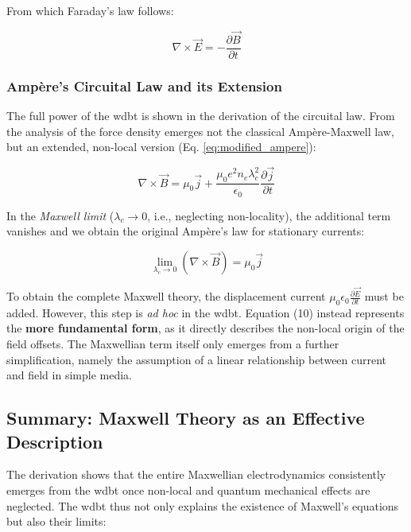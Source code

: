 From which Faraday's law follows:

\begin{equation}
    \nabla \times \vec{E} = -\frac{\partial \vec{B}}{\partial t}
\end{equation}

\subsubsection{Ampère's Circuital Law and its Extension}

The full power of the \gls{wdbt} is shown in the derivation of the circuital law. From the analysis of the force density emerges not the classical Ampère-Maxwell law, but an extended, non-local version (Eq. \ref{eq:modified_ampere}):

\begin{equation}
    \nabla \times \vec{B} = \mu_0 \vec{j} + \frac{\mu_0 e^2 n_e \lambda_c^2}{\epsilon_0} \frac{\partial \vec{j}}{\partial t}
\end{equation}

In the \textit{Maxwell limit} ($\lambda_c \rightarrow 0$, i.e., neglecting non-locality), the additional term vanishes and we obtain the original Ampère's law for stationary currents:

\begin{equation}
    \lim_{\lambda_c \to 0} \left( \nabla \times \vec{B} \right) = \mu_0 \vec{j}
\end{equation}

To obtain the complete Maxwell theory, the displacement current $\mu_0 \epsilon_0 \frac{\partial \vec{E}}{\partial t}$ must be added. However, this step is \textit{ad hoc} in the \gls{wdbt}. Equation (10) instead represents the \textbf{more fundamental form}, as it directly describes the non-local origin of the field offsets. The Maxwellian term itself only emerges from a further simplification, namely the assumption of a linear relationship between current and field in simple media.

\subsection{Summary: Maxwell Theory as an Effective Description}

The derivation shows that the entire Maxwellian electrodynamics consistently emerges from the \gls{wdbt} once non-local and quantum mechanical effects are neglected. The \gls{wdbt} thus not only explains the existence of Maxwell's equations but also their limits:

